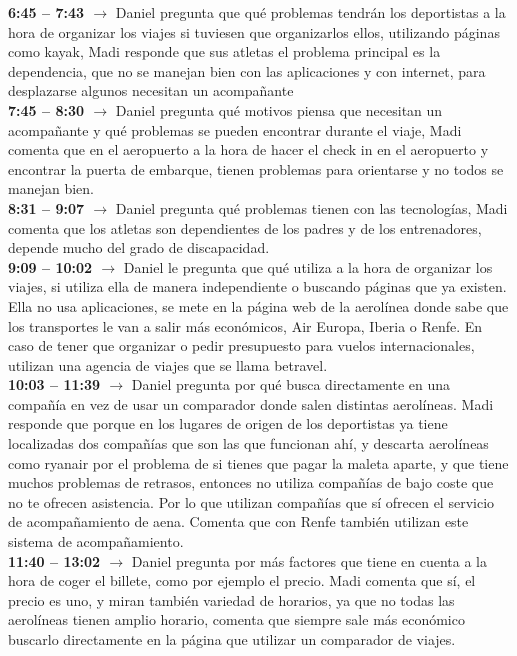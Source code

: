 \textbf{6:45 -- 7:43 $\rightarrow$} Daniel pregunta que qué problemas tendrán los deportistas a la hora de organizar los viajes si tuviesen que organizarlos ellos, utilizando páginas como kayak, Madi responde que sus atletas el problema principal es la dependencia, que no se manejan bien con las aplicaciones y con internet, para desplazarse algunos necesitan un acompañante \\
\textbf{7:45 -- 8:30 $\rightarrow$} Daniel pregunta qué motivos piensa que necesitan un acompañante y qué problemas se pueden encontrar durante el viaje, Madi comenta que en el aeropuerto a la hora de hacer el check in en el aeropuerto y encontrar la puerta de embarque, tienen problemas para orientarse y no todos se manejan bien. \\
\textbf{8:31 -- 9:07 $\rightarrow$} Daniel pregunta qué problemas tienen con las tecnologías, Madi comenta que los atletas son dependientes de los padres y de los entrenadores, depende mucho del grado de discapacidad. \\
\textbf{9:09 -- 10:02 $\rightarrow$} Daniel le pregunta que qué utiliza a la hora de organizar los viajes, si utiliza ella de manera independiente o buscando páginas que ya existen. Ella no usa aplicaciones, se mete en la página web de la aerolínea donde sabe que los transportes le van a salir más económicos, Air Europa, Iberia o Renfe. En caso de tener que organizar o pedir presupuesto para vuelos internacionales, utilizan una agencia de viajes que se llama betravel. \\
\textbf{10:03 -- 11:39 $\rightarrow$} Daniel pregunta por qué busca directamente en una compañía en vez de usar un comparador donde salen distintas aerolíneas. Madi responde que porque en los lugares de origen de los deportistas ya tiene localizadas dos compañías que son las que funcionan ahí, y descarta aerolíneas como ryanair por el problema de si tienes que pagar la maleta aparte, y que tiene muchos problemas de retrasos, entonces no utiliza compañías de bajo coste que no te ofrecen asistencia.  Por lo que utilizan compañías que sí ofrecen el servicio de acompañamiento de aena. Comenta que con Renfe también utilizan este sistema de acompañamiento. \\
\textbf{11:40 -- 13:02 $\rightarrow$} Daniel pregunta por más factores que tiene en cuenta a la hora de coger el billete, como por ejemplo el precio. Madi comenta que sí, el precio es uno, y miran también variedad de horarios, ya que no todas las aerolíneas tienen amplio horario, comenta que siempre sale más económico buscarlo directamente en la página que utilizar un comparador de viajes. \\
